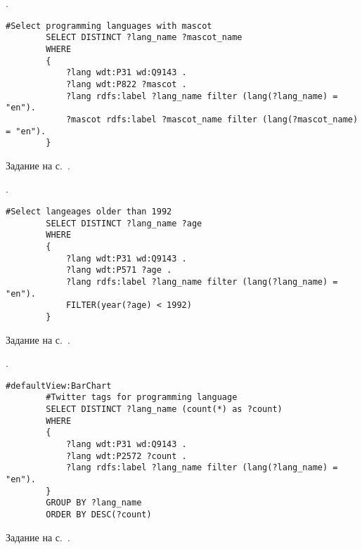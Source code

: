 \begin{task}
    \label{answer:prog_langs_4}
    . 
	\begin{lstlisting}[language=SPARQL, caption={{"Персонажи-талисманы" языков программирования}\protect\footnotemark}, label=lst:prog_lang_answer_4]
		#Select programming languages with mascot
		SELECT DISTINCT ?lang_name ?mascot_name
		WHERE
		{
		    ?lang wdt:P31 wd:Q9143 .
		    ?lang wdt:P822 ?mascot .
		    ?lang rdfs:label ?lang_name filter (lang(?lang_name) = "en").
		    ?mascot rdfs:label ?mascot_name filter (lang(?mascot_name) = "en").
		}
	\end{lstlisting}
    
    \small{Задание на с.~\pageref{prog_lang_test}.}
\end{task}

\begin{task}
    \label{answer:prog_langs_5}
    . 
	\begin{lstlisting}[language=SPARQL, caption={{Языки программирования, старше 1992 года}\protect\footnotemark}, label=lst:prog_lang_answer_5]
		#Select langeages older than 1992
		SELECT DISTINCT ?lang_name ?age
		WHERE
		{
		    ?lang wdt:P31 wd:Q9143 .
		    ?lang wdt:P571 ?age .
		    ?lang rdfs:label ?lang_name filter (lang(?lang_name) = "en").
		    FILTER(year(?age) < 1992)
		}
	\end{lstlisting}
    
    \small{Задание на с.~\pageref{prog_lang_test}.}
\end{task}

\begin{task}
    \label{answer:prog_langs_6}
    . 
	\begin{lstlisting}[language=SPARQL, caption={{Хештеги языков программирования в Твиттере}\protect\footnotemark}, label=lst:prog_lang_answer_6]
		#defaultView:BarChart
		#Twitter tags for programming language
		SELECT DISTINCT ?lang_name (count(*) as ?count)
		WHERE
		{
		    ?lang wdt:P31 wd:Q9143 .
		    ?lang wdt:P2572 ?count .
		    ?lang rdfs:label ?lang_name filter (lang(?lang_name) = "en"). 
		} 
		GROUP BY ?lang_name 
		ORDER BY DESC(?count)
	\end{lstlisting}
    
    \small{Задание на с.~\pageref{prog_lang_test}.}
\end{task}




